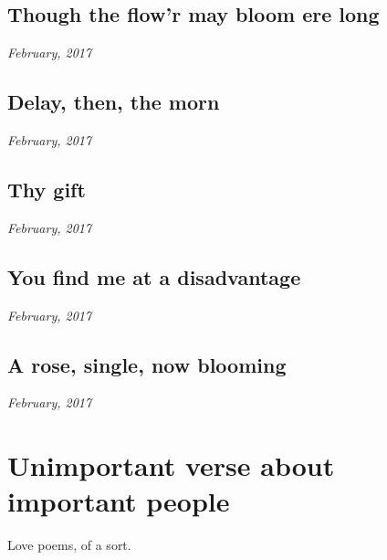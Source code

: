 \documentclass[10pt]{memoir}
\begin{document}

  \section{Though the flow'r may bloom ere long}

  \hfill\textit{February, 2017}

  
  \newpage


  \section{Delay, then, the morn}

  \hfill\textit{February, 2017}

  
  \newpage


  \section{Thy gift}

  \hfill\textit{February, 2017}

  
  \newpage


  \section{You find me at a disadvantage}

  \hfill\textit{February, 2017}

  
  \newpage


  \section{A rose, single, now blooming}

  \hfill\textit{February, 2017}
  \null
  


  \chapter{Unimportant verse about important people}

  Love poems, of a sort.
\end{document}
